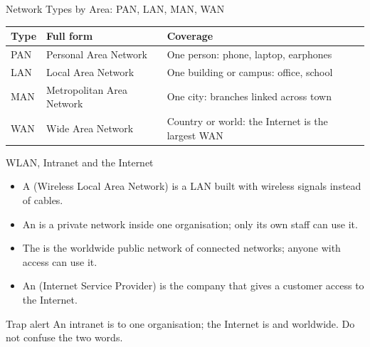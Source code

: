\documentclass[aspectratio=169]{beamer}
\begin{document}
\begin{frame}{Network Types by Area: PAN, LAN, MAN, WAN}
  \begin{center}
    \begin{tabular}{p{}p{}p{}}
      \toprule
      \textbf{Type} & \textbf{Full form} & \textbf{Coverage} \\
      \midrule
      PAN & Personal Area Network & One person: phone, laptop, earphones \\
      LAN & Local Area Network & One building or campus: office, school \\
      MAN & Metropolitan Area Network & One city: branches linked across town \\
      WAN & Wide Area Network & Country or world: the Internet is the largest WAN \\
      \bottomrule
    \end{tabular}
  \end{center}
  \vspace{0.25cm}
\end{frame}

\begin{frame}{WLAN, Intranet and the Internet}
  \begin{itemize}
    \item A  (Wireless Local Area Network) is a LAN built with
      wireless signals instead of cables.
    \item An  is a private network inside one organisation;
      only its own staff can use it.
    \item The  is the worldwide public network of connected
      networks; anyone with access can use it.
    \item An  (Internet Service Provider) is the company that gives
      a customer access to the Internet.
  \end{itemize}
  \begin{alertblock}{Trap alert}
    An intranet is  to one organisation; the Internet is
     and worldwide. Do not confuse the two words.
  \end{alertblock}
\end{frame}
\end{document}
